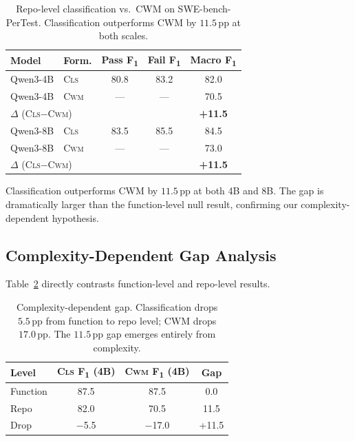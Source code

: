 \documentclass[11pt,a4paper]{article}
\newcommand{\cls}{\textsc{Cls}}
\newcommand{\cwm}{\textsc{Cwm}}
\newcommand{\fone}{F\textsubscript{1}}
\newcommand{\pp}{\,\text{pp}}
\begin{document}
\begin{table}[t]
\centering
\small
\begin{tabular}{llccc}
\toprule
\textbf{Model} & \textbf{Form.} & \textbf{Pass \fone} & \textbf{Fail \fone} & \textbf{Macro \fone} \\
\midrule
Qwen3-4B & \cls & 80.8 & 83.2 & 82.0 \\
Qwen3-4B & \cwm & --- & --- & 70.5 \\
\multicolumn{2}{l}{$\Delta$ (\cls$-$\cwm)} & & & \textbf{+11.5} \\
\midrule
Qwen3-8B & \cls & 83.5 & 85.5 & 84.5 \\
Qwen3-8B & \cwm & --- & --- & 73.0 \\
\multicolumn{2}{l}{$\Delta$ (\cls$-$\cwm)} & & & \textbf{+11.5} \\
\bottomrule
\end{tabular}
\caption{Repo-level classification vs.\ CWM on SWE-bench-PerTest. Classification outperforms CWM by $11.5\pp$ at both scales.}
\label{tab:repo-main}
\end{table}

Classification outperforms CWM by $11.5\pp$ at both 4B and 8B.
The gap is dramatically larger than the function-level null result, confirming our complexity-dependent hypothesis.

\subsection{Complexity-Dependent Gap Analysis}

Table~\ref{tab:complexity-gap} directly contrasts function-level and repo-level results.

\begin{table}[t]
\centering
\small
\begin{tabular}{lccc}
\toprule
\textbf{Level} & \textbf{\cls{} \fone{} (4B)} & \textbf{\cwm{} \fone{} (4B)} & \textbf{Gap} \\
\midrule
Function & 87.5 & 87.5 & 0.0 \\
Repo & 82.0 & 70.5 & 11.5 \\
\midrule
Drop & $-$5.5 & $-$17.0 & +11.5 \\
\bottomrule
\end{tabular}
\caption{Complexity-dependent gap. Classification drops $5.5\pp$ from function to repo level; CWM drops $17.0\pp$. The $11.5\pp$ gap emerges entirely from complexity.}
\label{tab:complexity-gap}
\end{table}
\end{document}
